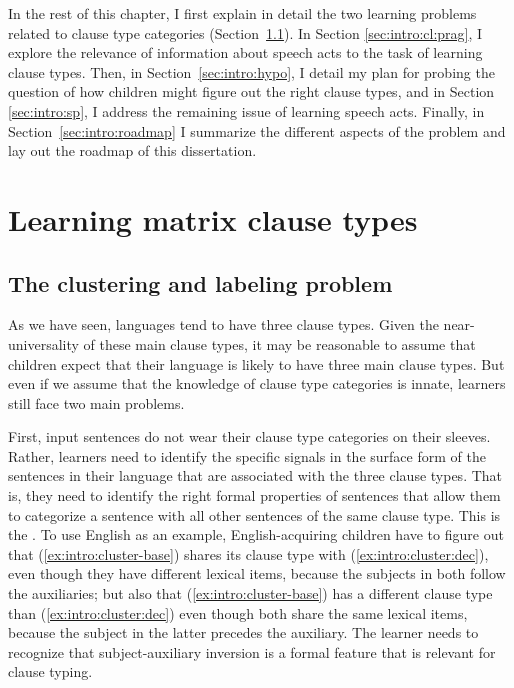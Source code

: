 
In the rest of this chapter, I first explain in detail the two learning problems related to clause type categories (Section~\ref{sec:intro:cl:problem}). In Section \ref{sec:intro:cl:prag}, I explore the relevance of information about speech acts to the task of learning clause types. Then, in Section~\ref{sec:intro:hypo}, I detail my plan for probing the question of how children might figure out the right clause types, and in Section \ref{sec:intro:sp}, I address the remaining issue of learning speech acts. Finally, in Section~\ref{sec:intro:roadmap} I summarize the different aspects of the problem and lay out the roadmap of this dissertation. 

\section{Learning matrix clause types}
\label{sec:intro:cl}
\subsection{The clustering and labeling problem}
\label{sec:intro:cl:problem}

As we have seen, languages tend to have three  clause types.  Given the near-universality of these main clause types, it may be reasonable to assume  that children expect that their language is likely to have three main clause types. But even if we assume that the knowledge of clause type categories is innate, learners still face two main problems.

First, input sentences do not wear their clause type categories on their sleeves. Rather, learners need to identify the specific signals in the surface form of the sentences in their language that are associated with the three clause types. That is, they need to identify the right formal properties of sentences that allow them to categorize a sentence with all other sentences of the same clause type. This is the .
To use English as an example, English-acquiring children have to figure out that (\ref{ex:intro:cluster-base}) shares its clause type with (\ref{ex:intro:cluster:dec}), even though they have different lexical items, because the subjects in both follow the auxiliaries; but also that (\ref{ex:intro:cluster-base}) has a different clause type than (\ref{ex:intro:cluster:dec}) even though both share the same lexical items, because the subject in the latter precedes the auxiliary. The learner needs to recognize that subject-auxiliary inversion is a formal feature that is relevant for clause typing.


